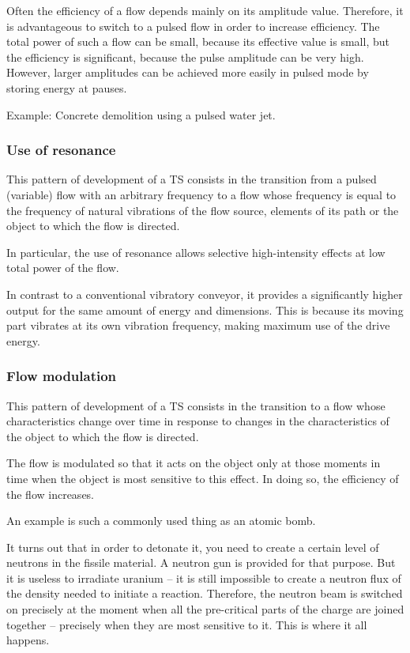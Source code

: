 \documentclass[a4paper,11pt]{article}
\begin{document}
Often the efficiency of a flow depends mainly on its amplitude value.
Therefore, it is advantageous to switch to a pulsed flow in order to increase
efficiency. The total power of such a flow can be small, because its effective
value is small, but the efficiency is significant, because the pulse amplitude
can be very high. However, larger amplitudes can be achieved more easily in
pulsed mode by storing energy at pauses.

Example: Concrete demolition using a pulsed water jet.

\subsubsection{Use of resonance}

This pattern of development of a TS consists in the transition from a pulsed
(variable) flow with an arbitrary frequency to a flow whose frequency is equal
to the frequency of natural vibrations of the flow source, elements of its
path or the object to which the flow is directed.

In particular, the use of resonance allows selective high-intensity effects at
low total power of the flow.

In contrast to a conventional vibratory conveyor, it provides a significantly
higher output for the same amount of energy and dimensions. This is because
its moving part vibrates at its own vibration frequency, making maximum use of
the drive energy.

\subsubsection{Flow modulation}

This pattern of development of a TS consists in the transition to a flow whose
characteristics change over time in response to changes in the characteristics
of the object to which the flow is directed.

The flow is modulated so that it acts on the object only at those moments in
time when the object is most sensitive to this effect. In doing so, the
efficiency of the flow increases.

An example is such a commonly used thing as an atomic bomb.

It turns out that in order to detonate it, you need to create a certain level
of neutrons in the fissile material. A neutron gun is provided for that
purpose. But it is useless to irradiate uranium -- it is still impossible to
create a neutron flux of the density needed to initiate a reaction. Therefore,
the neutron beam is switched on precisely at the moment when all the
pre-critical parts of the charge are joined together -- precisely when they
are most sensitive to it. This is where it all happens.
\end{document}
